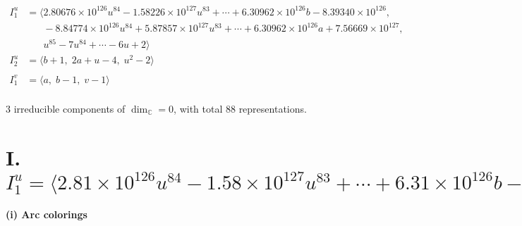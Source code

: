 \documentclass[1p]{elsarticle_modified}
\theoremstyle{definition}
\begin{document}
\begin{align*}
I^u_{1}&=\langle 
2.80676\times10^{126} u^{84}-1.58226\times10^{127} u^{83}+\cdots+6.30962\times10^{126} b-8.39340\times10^{126},\\
\phantom{I^u_{1}}&\phantom{= \langle  }-8.84774\times10^{126} u^{84}+5.87857\times10^{127} u^{83}+\cdots+6.30962\times10^{126} a+7.56669\times10^{127},\\
\phantom{I^u_{1}}&\phantom{= \langle  }u^{85}-7 u^{84}+\cdots-6 u+2\rangle \\
I^u_{2}&=\langle 
b+1,\;2 a+u-4,\;u^2-2\rangle \\
\\
I^v_{1}&=\langle 
a,\;b-1,\;v-1\rangle \\
\end{align*}
\raggedright * 3 irreducible components of $\dim_{\mathbb{C}}=0$, with total 88 representations.\\
\newpage
\renewcommand{\arraystretch}{1}
\centering \section*{I. $I^u_{1}= \langle 2.81\times10^{126} u^{84}-1.58\times10^{127} u^{83}+\cdots+6.31\times10^{126} b-8.39\times10^{126},\;-8.85\times10^{126} u^{84}+5.88\times10^{127} u^{83}+\cdots+6.31\times10^{126} a+7.57\times10^{127},\;u^{85}-7 u^{84}+\cdots-6 u+2 \rangle$}
\flushleft \textbf{(i) Arc colorings}\\
\end{document}
